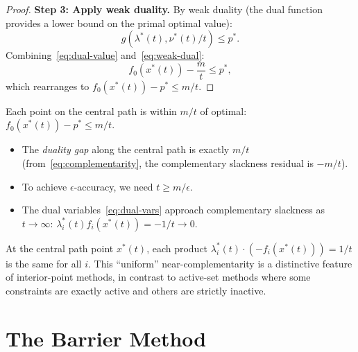 \documentclass[11pt,a4paper]{article}
\begin{document}
\begin{proof}
\textbf{Step 3: Apply weak duality.}
By weak duality (the dual function provides a lower bound on the
primal optimal value):
\begin{equation}\label{eq:weak-dual}
  g(\lambda^*(t), \nu^*(t)/t) \le p^*.
\end{equation}
Combining~\eqref{eq:dual-value} and~\eqref{eq:weak-dual}:
\begin{equation}\label{eq:bound-derived}
  f_0(x^*(t)) - \frac{m}{t} \le p^*,
\end{equation}
which rearranges to $f_0(x^*(t)) - p^* \le m/t$.
\end{proof}

\begin{keyresult}[title={Central Path Optimality Bound}]
Each point on the central path is within $m/t$ of optimal:
$f_0(x^*(t)) - p^* \le m/t$.
\begin{itemize}
  \item The \emph{duality gap} along the central path is exactly
    $m/t$ (from~\eqref{eq:complementarity}, the complementary
    slackness residual is $-m/t$).
  \item To achieve $\epsilon$-accuracy, we need $t \ge m/\epsilon$.
  \item The dual variables~\eqref{eq:dual-vars} approach complementary
    slackness as $t \to \infty$: $\lambda_i^*(t) f_i(x^*(t))
    = -1/t \to 0$.
\end{itemize}
\end{keyresult}

\begin{remark}%
\label{rem:approx-cs}
At the central path point $x^*(t)$, each product
$\lambda_i^*(t) \cdot (-f_i(x^*(t))) = 1/t$ is the same for all $i$.
This ``uniform'' near-complementarity is a distinctive feature of
interior-point methods, in contrast to active-set methods where some
constraints are exactly active and others are strictly inactive.
\end{remark}


\section{The Barrier Method}\label{sec:barrier-method}
\end{document}
